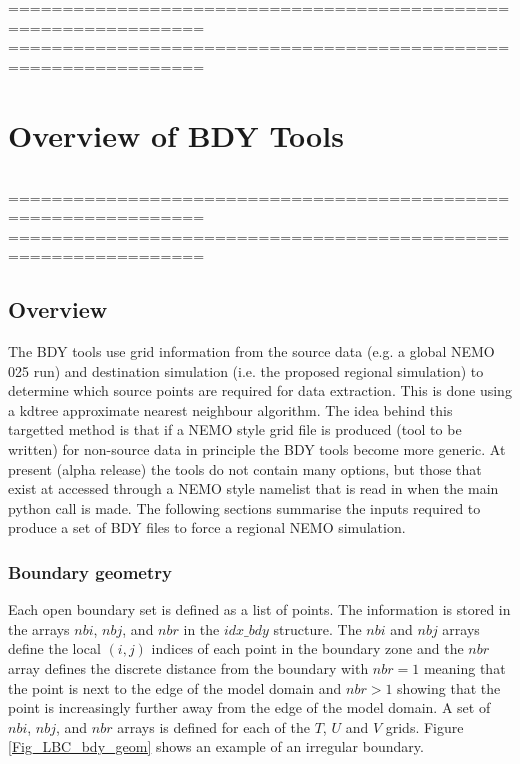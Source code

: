 %
================================================================
%
================================================================
\chapter{Overview of BDY Tools }
\label{setup}

$\ $\newline    %



%
\noindent ================================================================
%
================================================================

\section{Overview}


The BDY tools use grid information from the source data (e.g. a global NEMO 025
run) and destination simulation (i.e. the proposed regional simulation) to determine which source points are
required for data extraction. This is done using a kdtree approximate nearest
neighbour algorithm. The idea behind this targetted method is that if a NEMO
style grid file is produced (tool to be written) for non-\NEMO source data in principle the BDY tools
become more generic. At present (alpha release) the tools do not contain many
options, but those that exist at accessed through a NEMO style namelist that is read in
when the main python call is made. The following sections summarise the inputs
required to produce a set of BDY files to force a regional NEMO simulation.

\subsection{Boundary geometry}
\label{BDY_geometry}

Each open boundary set is defined as a list of points. The
information
is stored in the arrays $nbi$, $nbj$, and $nbr$ in the
$idx\_bdy$
structure.  The $nbi$ and $nbj$ arrays
define the local $(i,j)$ indices of each point in the boundary
zone
and the $nbr$ array defines the discrete distance from the
boundary
with $nbr=1$ meaning that the point is next to the edge of the
model domain and $nbr>1$ showing that the point is increasingly
further away from the edge of the model domain. A set of $nbi$,
$nbj$,
and $nbr$ arrays is defined for each of the $T$, $U$ and $V$
grids. Figure \ref{Fig_LBC_bdy_geom} shows an example of an
irregular
boundary.

